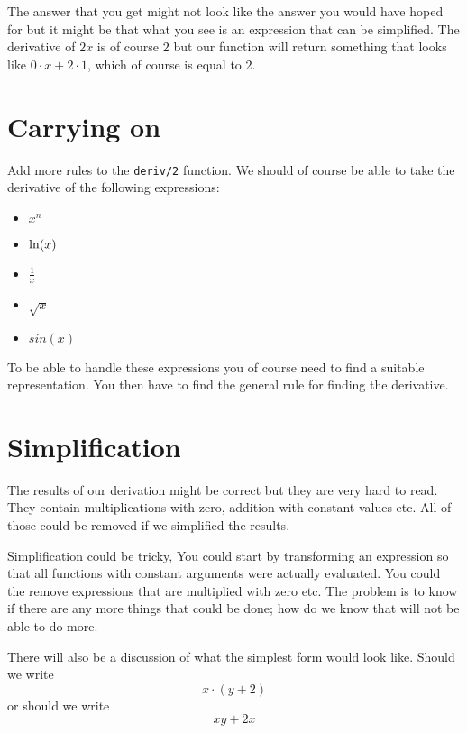 \documentclass[a4paper,11pt]{article}
\begin{document}
The answer that you get might not look like the answer you would have
hoped for but it might be that what you see is an expression that can
be simplified. The derivative of $2x$ is of course $2$ but our function
will return something that looks like $0\cdot x + 2\cdot 1$, which of course is equal to $2$.



\section{Carrying on}

Add more rules to the {\tt deriv/2} function. We should of course be
able to take the derivative of the following expressions:

\begin{itemize}
\item $x^n$
\item ${\rm ln}(x)$
\item $\frac{1}{x}$
\item $\sqrt{x}$
\item $sin(x)$
\end{itemize}

To be able to handle these expressions you of course need to find a
suitable representation. You then have to find the general rule for
finding the derivative.



\section{Simplification}

The results of our derivation might be correct but they are very hard
to read. They contain multiplications with zero, addition with
constant values etc. All of those could be removed if we simplified the results.

Simplification could be tricky, You could start by transforming an
expression so that all functions with constant arguments were actually
evaluated. You could the remove expressions that are multiplied with
zero etc. The problem is to know if there are any more things that
could be done; how do we know that will not be able to do more.

There will also be a discussion of what the simplest form would look like. Should we write $$ x \cdot  (y + 2)$$ or should we write $$xy + 2x$$
\end{document}
